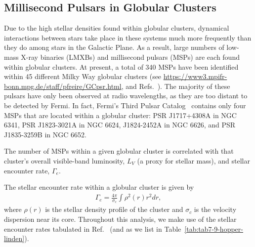 \subsection{Millisecond Pulsars in Globular Clusters}
\label{sec:cases}

Due to the high stellar densities found within globular clusters, dynamical interactions between stars take place in these systems much more frequently than they do among stars in the Galactic Plane. As a result, large numbers of low-mass X-ray binaries (LMXBs) and millisecond pulsars (MSPs) are each found within globular clusters. At present, a total of 340 MSPs have been identified within 45 different Milky Way globular clusters (see \url{https://www3.mpifr-bonn.mpg.de/staff/pfreire/GCpsr.html}, and Refs.~\cite{Manchester:2004bp,Fermi-LAT:2023zzt}). The majority of these pulsars have only been observed at radio wavelengths, as they are too distant to be detected by Fermi. In fact, Fermi's Third Pulsar Catalog~\cite{Fermi-LAT:2023zzt} contains only four MSPs that are located within a globular cluster: 
%
PSR J1717+4308A in NGC 6341, PSR J1823-3021A in NGC 6624, J1824-2452A in NGC 6626, and PSR J1835-3259B in NGC 6652. 

The number of MSPs within a given globular cluster is correlated with that cluster's overall visible-band luminosity, $L_V$ (a proxy for stellar mass), and stellar encounter rate, $\Gamma_e$. 

\noindent
The stellar encounter rate within a globular cluster is given by~\cite{2003ASPC..296..245V,1987IAUS..125..187V}
%
\begin{align}
\Gamma_e = \frac{4\pi}{\sigma_c} \int \rho^2(r) r^2 dr,
\end{align}
%
where $\rho(r)$ is the stellar density profile of the cluster and $\sigma_c$ is the velocity dispersion near its core. Throughout this analysis, we make use of the stellar encounter rates tabulated in Ref.~\cite{Bahramian:2013ihw} (and as we list in Table~\ref{tab:tab7-9-hopper-linden}).

